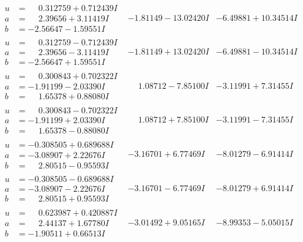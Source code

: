 \documentclass[1p]{elsarticle_modified}
\theoremstyle{definition}
\begin{document}
$$\begin{array}{c|c|c}
\begin{aligned}
u &= \phantom{-}0.312759 + 0.712439 I \\
a &= \phantom{-}2.39656 + 3.11419 I \\
b &= -2.56647 - 1.59551 I\end{aligned}
 & -1.81149 - 13.02420 I & -6.49881 + 10.34514 I \\ \hline\begin{aligned}
u &= \phantom{-}0.312759 - 0.712439 I \\
a &= \phantom{-}2.39656 - 3.11419 I \\
b &= -2.56647 + 1.59551 I\end{aligned}
 & -1.81149 + 13.02420 I & -6.49881 - 10.34514 I \\ \hline\begin{aligned}
u &= \phantom{-}0.300843 + 0.702322 I \\
a &= -1.91199 - 2.03390 I \\
b &= \phantom{-}1.65378 + 0.88080 I\end{aligned}
 & \phantom{-}1.08712 - 7.85100 I & -3.11991 + 7.31455 I \\ \hline\begin{aligned}
u &= \phantom{-}0.300843 - 0.702322 I \\
a &= -1.91199 + 2.03390 I \\
b &= \phantom{-}1.65378 - 0.88080 I\end{aligned}
 & \phantom{-}1.08712 + 7.85100 I & -3.11991 - 7.31455 I \\ \hline\begin{aligned}
u &= -0.308505 + 0.689688 I \\
a &= -3.08907 + 2.22676 I \\
b &= \phantom{-}2.80515 - 0.95593 I\end{aligned}
 & -3.16701 + 6.77469 I & -8.01279 - 6.91414 I \\ \hline\begin{aligned}
u &= -0.308505 - 0.689688 I \\
a &= -3.08907 - 2.22676 I \\
b &= \phantom{-}2.80515 + 0.95593 I\end{aligned}
 & -3.16701 - 6.77469 I & -8.01279 + 6.91414 I \\ \hline\begin{aligned}
u &= \phantom{-}0.623987 + 0.420887 I \\
a &= \phantom{-}2.44137 + 1.67780 I \\
b &= -1.90511 + 0.66513 I\end{aligned}
 & -3.01492 + 9.05165 I & -8.99353 - 5.05015 I \\ \hline\begin{aligned}

\end{aligned}
\end{array}$$
\end{document}
